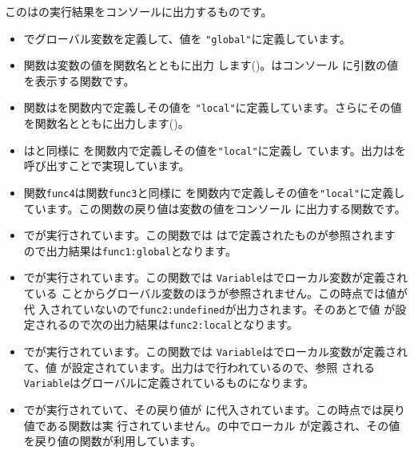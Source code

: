 この\HTML は\JS の実行結果をコンソールに出力するものです。
\begin{itemize}
 \item {}でグローバル変数を定義して、値を
       \texttt{"global"}に定義しています。
 \item 関数は変数の値を関数名とともに出力
       します()。はコンソール
       に引数の値を表示する関数です。
 \item 関数はを関数内で定義しその値を
       \texttt{"local"}に定義しています。さらにその値 
       を関数名とともに出力します()。
 \item {}はと同様に
       を関数内で定義しその値を\texttt{"local"}に定義し
       ています。出力はを呼び出すことで実現しています。
 \item 関数\texttt{func4}は関数\texttt{func3}と同様に
       を関数内で定義しその値を\texttt{"local"}に定義し
       ています。この関数の戻り値は変数の値をコンソール
       に出力する関数です。
 \item {}でが実行されています。この関数では
       はで定義されたものが参照されます
       ので出力結果は\texttt{func1:global}となります。
 \item {}でが実行されています。この関数では
       \texttt{Variable}はでローカル変数が定義されている
       ことからグローバル変数のほうが参照されません。この時点では値が代
       入されていないので\texttt{func2:undefined}が出力されます。そのあとで値
       が設定されるので次の出力結果は\texttt{func2:local}となります。
 \item {}でが実行されています。この関数では
       \texttt{Variable}はでローカル変数が定義されて、値
       が設定されています。出力はで行われているので、参照
       される\texttt{Variable}はグローバルに定義されているものになります。
 \item {}でが実行されていて、その戻り値が
       に代入されています。この時点では戻り値である関数は実
       行されていません。の中でローカル
       が定義され、その値を戻り値の関数が利用しています。

\end{itemize}
